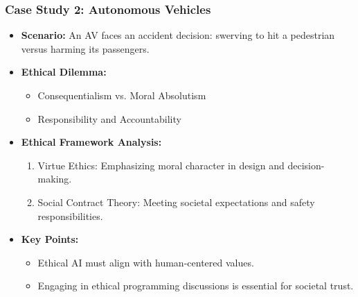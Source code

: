 \documentclass[aspectratio=169]{beamer}
\begin{document}
\begin{frame}[fragile]
    \frametitle{Case Study 2: Autonomous Vehicles}
    
    \begin{itemize}
        \item \textbf{Scenario:} An AV faces an accident decision: swerving to hit a pedestrian versus harming its passengers.
        
        \item \textbf{Ethical Dilemma:}
        \begin{itemize}
            \item Consequentialism vs. Moral Absolutism
            \item Responsibility and Accountability
        \end{itemize}
        
        \item \textbf{Ethical Framework Analysis:}
        \begin{enumerate}
            \item Virtue Ethics: Emphasizing moral character in design and decision-making.
            \item Social Contract Theory: Meeting societal expectations and safety responsibilities.
        \end{enumerate}
        
        \item \textbf{Key Points:}
        \begin{itemize}
            \item Ethical AI must align with human-centered values.
            \item Engaging in ethical programming discussions is essential for societal trust.
        \end{itemize}
    \end{itemize}
\end{frame}
\end{document}
